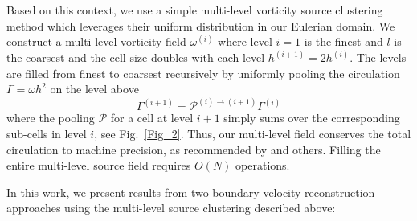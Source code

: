 \documentclass[final,1p,times]{elsarticle}
\begin{document}
Based on this context, we use a simple multi-level vorticity source clustering method which leverages their uniform distribution in our Eulerian domain. We construct a multi-level vorticity field $\omega^{(i)}$ where level $i=1$ is the finest and $l$ is the coarsest and the cell size doubles with each level $h^{(i+1)}=2h^{(i)}$. The levels are filled from finest to coarsest recursively by uniformly pooling the circulation $\Gamma=\omega h^2$ on the level above 
\begin{equation}
\Gamma^{(i+1)}=\mathcal{P}^{(i)\to(i+1)}\Gamma^{(i)}
\end{equation}
where the pooling $\mathcal{P}$ for a cell at level $i+1$ simply sums over the corresponding sub-cells in level $i$, see Fig.~\ref{Fig_2}. Thus, our multi-level field conserves the total circulation to machine precision, as recommended by \cite{Colonius2008} and others. Filling the entire multi-level source field requires $O(N)$ operations.

In this work, we present results from two boundary velocity reconstruction approaches using the multi-level source clustering described above:
\end{document}
